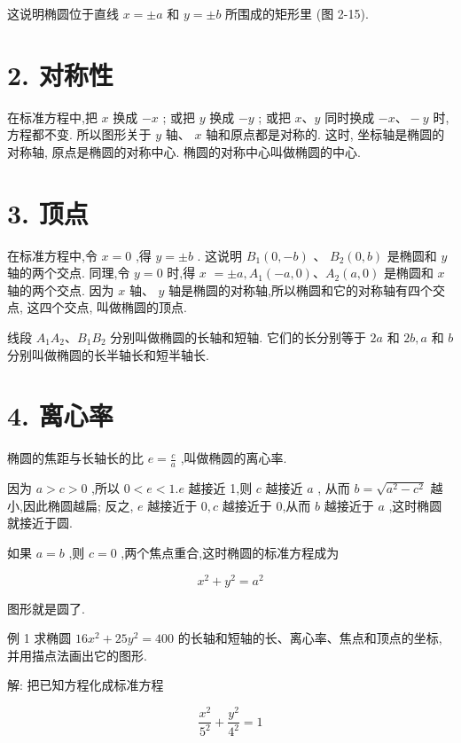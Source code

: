 \documentclass[lang=cn,newtx,12pt,scheme=chinese]{elegantbook}
\begin{document}
这说明椭圆位于直线 \(x = \pm a\) 和 \(y = \pm b\) 所围成的矩形里 (图 2-15).

\section*{2. 对称性}

在标准方程中,把 \(x\) 换成 \(- x\) ; 或把 \(y\) 换成 \(- y\) ; 或把 \(x\text{、}y\) 同时换成 \(- x\text{、} - y\) 时,方程都不变. 所以图形关于 \(y\) 轴、 \(x\) 轴和原点都是对称的. 这时, 坐标轴是椭圆的对称轴, 原点是椭圆的对称中心. 椭圆的对称中心叫做椭圆的中心.

\section*{3. 顶点}

在标准方程中,令 \(x = 0\) ,得 \(y = \pm b\) . 这说明 \({B}_{1}\left( {0, - b}\right)\) 、 \({B}_{2}\left( {0,b}\right)\) 是椭圆和 \(y\) 轴的两个交点. 同理,令 \(y = 0\) 时,得 \(x\) \(= \pm a,{A}_{1}\left( {-a,0}\right) \text{、}{A}_{2}\left( {a,0}\right)\) 是椭圆和 \(x\) 轴的两个交点. 因为 \(x\) 轴、 \(y\) 轴是椭圆的对称轴,所以椭圆和它的对称轴有四个交点, 这四个交点, 叫做椭圆的顶点.

线段 \({A}_{1}{A}_{2}\text{、}{B}_{1}{B}_{2}\) 分别叫做椭圆的长轴和短轴. 它们的长分别等于 \({2a}\) 和 \({2b},a\) 和 \(b\) 分别叫做椭圆的长半轴长和短半轴长.

\section*{4. 离心率}

椭圆的焦距与长轴长的比 \(e = \frac{c}{a}\) ,叫做椭圆的离心率.

因为 \(a > c > 0\) ,所以 \(0 < e < 1.e\) 越接近 1,则 \(c\) 越接近 \(a\) , 从而 \(b = \sqrt{{a}^{2} - {c}^{2}}\) 越小,因此椭圆越扁; 反之, \(e\) 越接近于 \(0,c\) 越接近于 0,从而 \(b\) 越接近于 \(a\) ,这时椭圆就接近于圆.

如果 \(a = b\) ,则 \(c = 0\) ,两个焦点重合,这时椭圆的标准方程成为

\[
    {x}^{2} + {y}^{2} = {a}^{2}
\]

图形就是圆了.

例 1 求椭圆 \({16}{x}^{2} + {25}{y}^{2} = {400}\) 的长轴和短轴的长、离心率、焦点和顶点的坐标, 并用描点法画出它的图形.

解: 把已知方程化成标准方程

\[
  \frac{{x}^{2}}{{5}^{2}} + \frac{{y}^{2}}{{4}^{2}} = 1
\]
\end{document}
